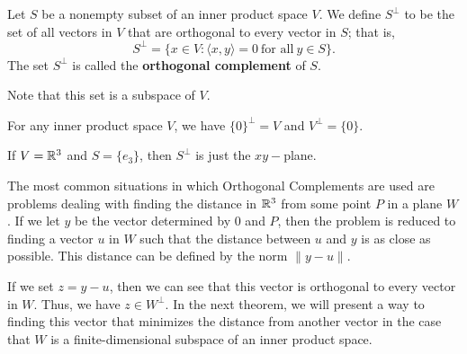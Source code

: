 \begin{definition}
    Let \( S  \) be a nonempty subset of an inner product space \( V  \). We define \( S^{\perp} \) to be the set of all vectors in \( V  \) that are orthogonal to every vector in \( S  \); that is, 
    \[  S^{\perp} = \{ x \in V : \langle x , y \rangle = 0 \ \text{for all} \ y \in S  \}. \]
    The set \( S^{\perp} \) is called the \textbf{orthogonal complement} of \( S  \).
\end{definition}

Note that this set is a subspace of \( V  \).

\begin{eg}
    For any inner product space \( V  \), we have \( \{ 0 \}^{\perp} = V  \) and \( V^{\perp} = \{ 0 \}  \).
\end{eg}

\begin{eg}
    If \( V = \mathbb{R}^{3} \) and \( S = \{ {e}_{3} \}  \), then \( S^{\perp} \) is just the \( xy- \)plane.
\end{eg}

The most common situations in which Orthogonal Complements are used are problems dealing with finding the distance in \( \mathbb{R}^{3} \) from some point \( P  \) in a plane \( W  \). If we let \( y  \) be the vector determined by \( 0  \) and \( P  \), then the problem is reduced to finding a vector \( u \) in \( W  \) such that the distance between \( u \) and \( y  \) is as close as possible. This distance can be defined by the norm \( \| y - u\|  \).   

If we set \( z = y - u \), then we can see that this vector is orthogonal to every vector in \( W  \). Thus, we have \( z \in W^{\perp}  \). In the next theorem, we will present a way to finding this vector that minimizes the distance from another vector in the case that \( W  \) is a finite-dimensional subspace of an inner product space. 


